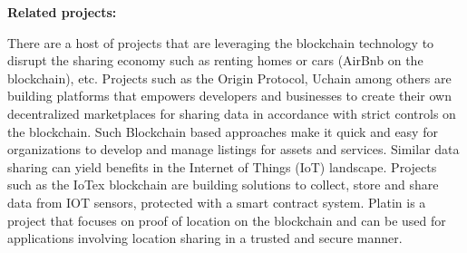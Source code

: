 %
%
%

\noindent
{\bf \textsf Related projects:}

There are a host of projects that are leveraging the blockchain technology to disrupt the
sharing economy such as renting homes or cars (AirBnb on the blockchain), etc. Projects such as the Origin Protocol,
Uchain among others are building platforms that empowers developers and businesses to create their own decentralized
marketplaces for sharing data in accordance with strict controls on the blockchain.  Such Blockchain based approaches
make it quick and easy for organizations to develop and manage listings for assets and services. Similar data sharing
can yield benefits in the Internet of Things (IoT) landscape. Projects such as the IoTex blockchain are building
solutions to collect, store and share data from IOT sensors, protected with a smart contract system.
Platin \cite{platin} is a project that focuses on proof of location on the blockchain and can be used for applications
involving location sharing in a trusted and secure manner.

